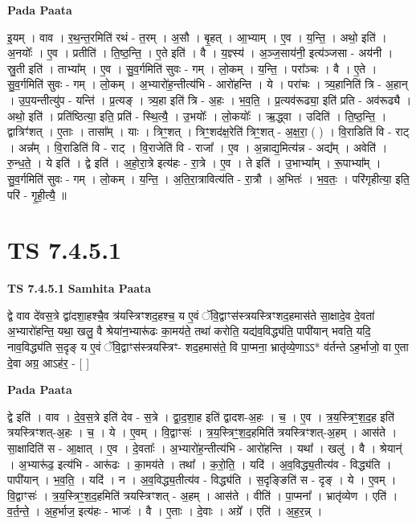 \documentclass[17pt]{extarticle}
\begin{document}
\textbf{Pada Paata} \newline

इ॒यम् । वाव । र॒थ॒न्त॒रमिति॑ रथं - त॒रम् । अ॒सौ । बृ॒हत् । आ॒भ्याम् । ए॒व । य॒न्ति॒ । अथो॒ इति॑ । अ॒नयोः᳚ । ए॒व । प्रतीति॑ । ति॒ष्ठ॒न्ति॒ । ए॒ते इति॑ । वै । य॒ज्ञ्स्य॑ । अ॒ञ्ज॒साय॑नी॒ इत्य॑ञ्जसा - अय॑नी । स्रु॒ती इति॑ । ताभ्या᳚म् । ए॒व । सु॒व॒र्गमिति॑ सुवः - गम् । लो॒कम् । य॒न्ति॒ । परा᳚ञ्चः । वै । ए॒ते । सु॒व॒र्गमिति॑ सुवः - गम् । लो॒कम् । अ॒भ्यारो॑ह॒न्तीत्य॑भि - आरो॑हन्ति । ये । परा॑चः । त्र्य॒हानिति॑ त्रि - अ॒हान् । उ॒प॒यन्तीत्यु॑प - यन्ति॑ । प्र॒त्यङ् । त्र्य॒हा इति॑ त्रि - अ॒हः । भ॒व॒ति॒ । प्र॒त्यव॑रूढ्या॒ इति॑ प्रति - अव॑रूढ्यै । अथो॒ इति॑ । प्रति॑ष्ठित्या॒ इति॒ प्रति॑ - स्थि॒त्यै॒ । उ॒भयोः᳚ । लो॒कयोः᳚ । ऋ॒द्ध्वा । उदिति॑ । ति॒ष्ठ॒न्ति॒ । द्वात्रिꣳ॑शत् । ए॒ताः । तासा᳚म् । याः । त्रिꣳ॒॒शत् । त्रिꣳ॒॒शद॑क्ष॒रेति॑ त्रिꣳ॒॒शत् - अ॒क्ष॒रा॒ ( ) । वि॒राडिति॑ वि - राट् । अन्न᳚म् । वि॒राडिति॑ वि - राट् । वि॒राजेति॑ वि - राजा᳚ । ए॒व । अ॒न्नाद्य॒मित्य॑न्न - अद्य᳚म् । अवेति॑ । रु॒न्ध॒ते॒ । ये इति॑ । द्वे इति॑ । अ॒हो॒रा॒त्रे इत्य॑हः - रा॒त्रे । ए॒व । ते इति॑ । उ॒भाभ्या᳚म् । रू॒पाभ्या᳚म् । सु॒व॒र्गमिति॑ सुवः - गम् । लो॒कम् । य॒न्ति॒ । अ॒ति॒रा॒त्रावित्य॑ति - रा॒त्रौ । अ॒भितः॑ । भ॒व॒तः॒ । परि॑गृहीत्या॒ इति॒ परि॑ - गृ॒ही॒त्यै॒ ॥  \newline





\section{ TS 7.4.5.1 }

\textbf{TS 7.4.5.1 } \newline
\textbf{Samhita Paata} \newline

द्वे वाव दे॑वस॒त्रे द्वा॑दशा॒हश्चै॒व त्र॑यस्त्रिꣳशद॒हश्च॒ य ए॒वं ॅवि॒द्वाꣳस॑स्त्रयस्त्रिꣳशद॒हमास॑ते सा॒क्षादे॒व दे॒वता॑ अ॒भ्यारो॑हन्ति॒ यथा॒ खलु॒ वै श्रेया॑न॒भ्यारू॑ढः का॒मय॑ते॒ तथा॑ करोति॒ यद्य॑व॒विद्ध्य॑ति॒ पापी॑यान् भवति॒ यदि॒ नाव॒विद्ध्य॑ति स॒दृङ् य ए॒वं ॅवि॒द्वाꣳस॑स्त्रयस्त्रिꣳ- शद॒हमास॑ते॒ वि पा॒प्मना॒ भ्रातृ॑व्ये॒णाऽऽ* व॑र्तन्ते ऽह॒र्भाजो॒ वा ए॒ता दे॒वा अग्र॒ आऽह॑र॒ - [  ] \newline

\textbf{Pada Paata} \newline

द्वे इति॑ । वाव । दे॒व॒स॒त्रे इति॑ देव - स॒त्रे । द्वा॒द॒शा॒ह इति॑ द्वादश-अ॒हः । च॒ । ए॒व । त्र॒य॒स्त्रिꣳ॒॒श॒द॒ह इति॑ त्रयस्त्रिꣳशत्-अ॒हः । च॒ । ये । ए॒वम् । वि॒द्वाꣳसः॑ । त्र॒य॒स्त्रिꣳ॒॒श॒द॒हमिति॑ त्रयस्त्रिꣳशत्-अ॒हम् । आस॑ते । सा॒क्षादिति॑ स - आ॒क्षात् । ए॒व । दे॒वताः᳚ । अ॒भ्यारो॑ह॒न्तीत्य॑भि - आरो॑हन्ति । यथा᳚ । खलु॑ । वै । श्रेयान्॑ । अ॒भ्यारू॑ढ॒ इत्य॑भि - आरू॑ढः । का॒मय॑ते । तथा᳚ । क॒रो॒ति॒ । यदि॑ । अ॒व॒विद्ध्य॒तीत्य॑व - विद्ध्य॑ति । पापी॑यान् । भ॒व॒ति॒ । यदि॑ । न । अ॒व॒विद्ध्य॒तीत्य॑व - विद्ध्य॑ति । स॒दृङ्ङिति॑ स - दृङ् । ये । ए॒वम् । वि॒द्वाꣳसः॑ । त्र॒य॒स्त्रिꣳ॒॒श॒द॒हमिति॑ त्रयस्त्रिꣳशत् - अ॒हम् । आस॑ते । वीति॑ । पा॒प्मना᳚ । भ्रातृ॑व्येण । एति॑ । व॒र्त॒न्ते॒ । अ॒ह॒र्भाज॒ इत्य॑हः - भाजः॑ । वै । ए॒ताः । दे॒वाः । अग्रे᳚ । एति॑ । अ॒ह॒र॒न्न् ।  \newline
\end{document}
